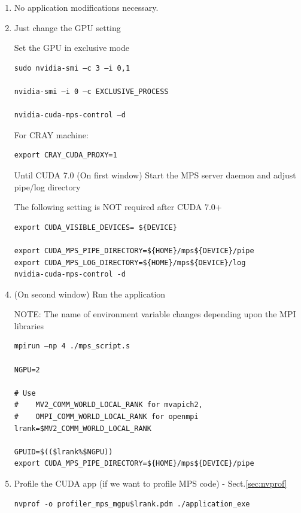 \begin{enumerate}
  \item No application modifications necessary.
  
  \item Just change the GPU setting
  
Set the GPU in exclusive mode
\begin{verbatim}
sudo nvidia-smi –c 3 –i 0,1 

nvidia-smi –i 0 –c EXCLUSIVE_PROCESS

nvidia-cuda-mps-control –d
\end{verbatim}

For CRAY machine:
\begin{verbatim}
export CRAY_CUDA_PROXY=1
\end{verbatim}

  \item [Until CUDA 7.0] (On first window) Start the MPS server daemon and adjust pipe/log directory

The following setting is NOT required after CUDA 7.0+
\begin{verbatim}
export CUDA_VISIBLE_DEVICES= ${DEVICE}

export CUDA_MPS_PIPE_DIRECTORY=${HOME}/mps${DEVICE}/pipe 
export CUDA_MPS_LOG_DIRECTORY=${HOME}/mps${DEVICE}/log
nvidia-cuda-mps-control -d
\end{verbatim}

  \item (On second window) Run the application

NOTE: The name of environment variable changes depending upon the MPI libraries
\begin{verbatim}
mpirun –np 4 ./mps_script.s

NGPU=2

# Use
#    MV2_COMM_WORLD_LOCAL_RANK for mvapich2,
#    OMPI_COMM_WORLD_LOCAL_RANK for openmpi 
lrank=$MV2_COMM_WORLD_LOCAL_RANK

GPUID=$(($lrank%$NGPU))
export CUDA_MPS_PIPE_DIRECTORY=${HOME}/mps${DEVICE}/pipe
\end{verbatim}  

  \item Profile the CUDA app (if we want to profile MPS code) - Sect.\ref{sec:nvprof}
   
\begin{verbatim}
nvprof -o profiler_mps_mgpu$lrank.pdm ./application_exe
\end{verbatim}
\end{enumerate}

